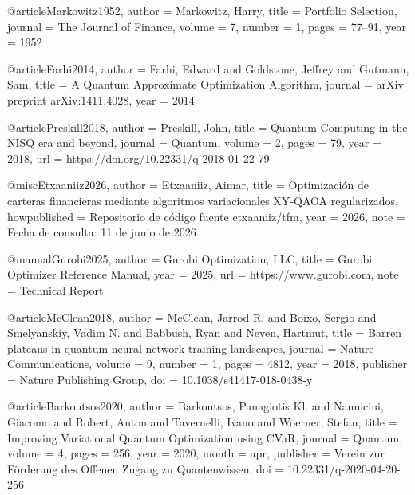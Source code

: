 @article{Markowitz1952,
  author    = {Markowitz, Harry},
  title     = {Portfolio Selection},
  journal   = {The Journal of Finance},
  volume    = {7},
  number    = {1},
  pages     = {77--91},
  year      = {1952}
}

@article{Farhi2014,
  author    = {Farhi, Edward and Goldstone, Jeffrey and Gutmann, Sam},
  title     = {A Quantum Approximate Optimization Algorithm},
  journal   = {arXiv preprint arXiv:1411.4028},
  year      = {2014}
}

@article{Preskill2018,
  author    = {Preskill, John},
  title     = {Quantum Computing in the {NISQ} era and beyond},
  journal   = {Quantum},
  volume    = {2},
  pages     = {79},
  year      = {2018},
  url       = {https://doi.org/10.22331/q-2018-01-22-79}
}

@misc{Etxaaniiz2026,
  author    = {Etxaaniiz, Aimar},
  title     = {Optimizaci{\'o}n de carteras financieras mediante algoritmos variacionales XY-QAOA regularizados},
  howpublished = {Repositorio de c{\'o}digo fuente etxaaniiz/tfm},
  year      = {2026},
  note      = {Fecha de consulta: 11 de junio de 2026}
}

@manual{Gurobi2025,
  author       = {{Gurobi Optimization, LLC}},
  title        = {Gurobi Optimizer Reference Manual},
  year         = {2025},
  url          = {https://www.gurobi.com},
  note         = {Technical Report}
}

@article{McClean2018,
  author       = {McClean, Jarrod R. and Boixo, Sergio and Smelyanskiy, Vadim N. and Babbush, Ryan and Neven, Hartmut},
  title        = {Barren plateaus in quantum neural network training landscapes},
  journal      = {Nature Communications},
  volume       = {9},
  number       = {1},
  pages        = {4812},
  year         = {2018},
  publisher    = {Nature Publishing Group},
  doi          = {10.1038/s41417-018-0438-y}
}

@article{Barkoutsos2020,
  author       = {Barkoutsos, Panagiotis Kl. and Nannicini, Giacomo and Robert, Anton and Tavernelli, Ivano and Woerner, Stefan},
  title        = {Improving Variational Quantum Optimization using {CVaR}},
  journal      = {Quantum},
  volume       = {4},
  pages        = {256},
  year         = {2020},
  month        = apr,
  publisher    = {{Verein zur F{\"o}rderung des Offenen Zugang zu Quantenwissen}},
  doi          = {10.22331/q-2020-04-20-256}
}